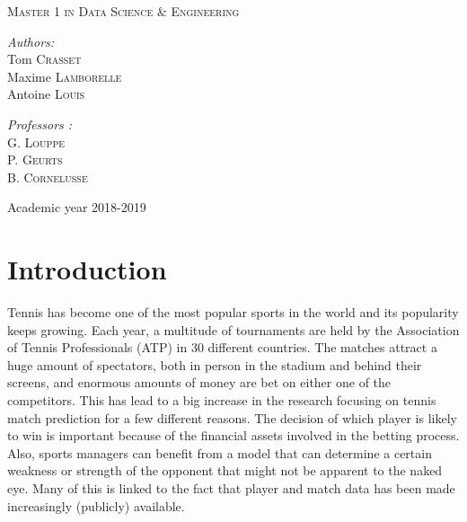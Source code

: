 \documentclass[12pt]{article}
\begin{document}
\begin{titlepage}
\begin{sffamily}
\begin{center}
    \textsc{Master 1 in Data Science \& Engineering} \\[2.5cm]

   \begin{minipage}{0.4\textwidth}
      \begin{flushleft} \large
        \emph{Authors:}\\
        Tom \textsc{Crasset}\\
        Maxime \textsc{Lamborelle}\\
        Antoine \textsc{Louis} 
      \end{flushleft}
    \end{minipage}
    \begin{minipage}{0.4\textwidth}
      \begin{flushright} \large
        \emph{Professors :}\\
        G. \textsc{Louppe}\\
        P. \textsc{Geurts}\\
        B. \textsc{Cornelusse}
        
      \end{flushright}
    \end{minipage}
    


    \vfill

    
    {\large Academic year 2018-2019}

  \end{center}
  \end{sffamily}
\end{titlepage}
\section*{Introduction}
Tennis has become one of the most popular sports in the world and its popularity keeps growing. Each year, a multitude of tournaments are held by the Association of Tennis Professionals (ATP) in 30 different countries.
The matches attract a huge amount of spectators, both in person in the stadium and behind their screens, and enormous amounts of money are bet on either one of the competitors.
This has lead to a big increase in the research focusing on tennis match prediction for a few different reasons. The decision of which player is likely to win is important because of the financial assets involved in the betting process. Also, sports managers can benefit from a model that can determine a certain weakness or strength of the opponent that might not be apparent to the naked eye.
Many of this is linked to the fact that player and match data has been made increasingly (publicly) available.
\end{document}
